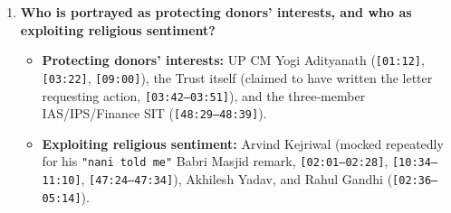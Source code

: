 \documentclass[10pt,a4paper]{article}
\begin{document}
\begin{enumerate}[leftmargin=1.6em, itemsep=4pt, topsep=4pt]
\begin{itemize}[leftmargin=1.4em, itemsep=2pt, topsep=2pt]
  \end{itemize}
  \item \textbf{Who is portrayed as protecting donors' interests, and who as exploiting religious sentiment?}
  \begin{itemize}[leftmargin=1.4em, itemsep=2pt, topsep=2pt]
    \item \textbf{Protecting donors' interests:} UP CM Yogi Adityanath (\texttt{[01:12]}, \texttt{[03:22]}, \texttt{[09:00]}), the Trust itself (claimed to have written the letter requesting action, \texttt{[03:42--03:51]}), and the three-member IAS/IPS/Finance SIT (\texttt{[48:29--48:39]}).
    \item \textbf{Exploiting religious sentiment:} Arvind Kejriwal (mocked repeatedly for his \texttt{"nani told me"} Babri Masjid remark, \texttt{[02:01--02:28]}, \texttt{[10:34--11:10]}, \texttt{[47:24--47:34]}), Akhilesh Yadav, and Rahul Gandhi (\texttt{[02:36--05:14]}).
  \end{itemize}
\end{enumerate}
\end{document}
